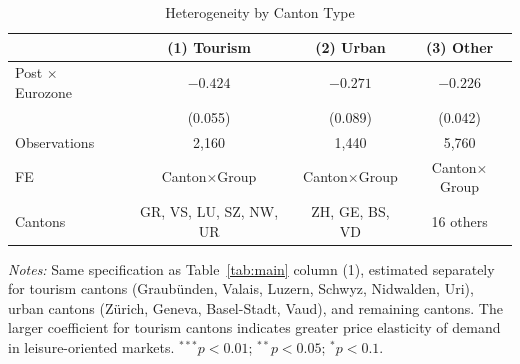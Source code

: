\begin{table}[t]
\begin{threeparttable}
\centering
\caption{Heterogeneity by Canton Type}
\label{tab:hetero}
\begin{tabular}{lccc}
\toprule
 & (1) Tourism & (2) Urban & (3) Other \\
\midrule
Post $\times$ Eurozone & $-0.424$ & $-0.271$ & $-0.226$ \\
 & (0.055) & (0.089) & (0.042) \\[6pt]
\midrule
Observations & 2,160 & 1,440 & 5,760 \\
FE & Canton$\times$Group & Canton$\times$Group & Canton$\times$Group \\
Cantons & GR, VS, LU, SZ, NW, UR & ZH, GE, BS, VD & 16 others \\
\bottomrule
\end{tabular}
\begin{tablenotes}
\item \textit{Notes:} Same specification as Table~\ref{tab:main} column (1), estimated separately for tourism cantons (Graubünden, Valais, Luzern, Schwyz, Nidwalden, Uri), urban cantons (Zürich, Geneva, Basel-Stadt, Vaud), and remaining cantons. The larger coefficient for tourism cantons indicates greater price elasticity of demand in leisure-oriented markets. $^{***}p<0.01$; $^{**}p<0.05$; $^{*}p<0.1$.
\end{tablenotes}
\end{threeparttable}
\end{table}
